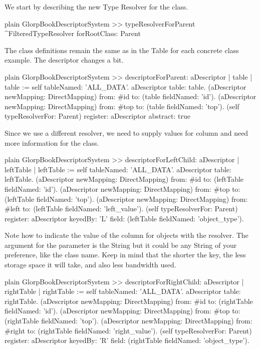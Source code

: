 \documentclass[10pt,twoside,english]{_support/latex/sbabook/sbabook}
\begin{document}
We start by describing the new Type Resolver for the  class.

\begin{displaycode}{plain}
GlorpBookDescriptorSystem >> typeResolverForParent
	^FilteredTypeResolver forRootClass: Parent
\end{displaycode}

The class definitions remain the same as in the Table for each concrete
class example. The descriptor changes a bit.

\begin{displaycode}{plain}
GlorpBookDescriptorSystem >> descriptorForParent: aDescriptor
	| table |
	table := self tableNamed: 'ALL_DATA'.
	aDescriptor table: table.
	(aDescriptor newMapping: DirectMapping)
		from: #id to: (table fieldNamed: 'id').
	(aDescriptor newMapping: DirectMapping)
		from: #top to: (table fieldNamed: 'top').
	(self typeResolverFor: Parent)
		register: aDescriptor abstract: true
\end{displaycode}

Since we use a different resolver, we need to supply values for 
column and need more information for the  class.

\begin{displaycode}{plain}
GlorpBookDescriptorSystem >> descriptorForLeftChild: aDescriptor
	| leftTable |
	leftTable := self tableNamed: 'ALL_DATA'.
	aDescriptor table: leftTable.
	(aDescriptor newMapping: DirectMapping)
		from: #id to: (leftTable fieldNamed: 'id').
	(aDescriptor newMapping: DirectMapping)
		from: #top to: (leftTable fieldNamed: 'top').
	(aDescriptor newMapping: DirectMapping)
		from: #left to: (leftTable fieldNamed: 'left_value').
	(self typeResolverFor: Parent)
		register: aDescriptor
		keyedBy: 'L'
		field: (leftTable fieldNamed: 'object_type').
\end{displaycode}

Note how to indicate the value of the  column for
 objects with the resolver.
The argument for the  parameter is the String  but it could be any String of your preference, like the class name. Keep in mind that the shorter the key, the less storage space it will take, and also less bandwidth used.

\begin{displaycode}{plain}
GlorpBookDescriptorSystem >> descriptorForRightChild: aDescriptor
	| rightTable |
	rightTable := self tableNamed: 'ALL_DATA'.
	aDescriptor table: rightTable.
	(aDescriptor newMapping: DirectMapping)
		from: #id to: (rightTable fieldNamed: 'id').
	(aDescriptor newMapping: DirectMapping)
		from: #top to: (rightTable fieldNamed: 'top').
	(aDescriptor newMapping: DirectMapping)
		from: #right to: (rightTable fieldNamed: 'right_value').
	(self typeResolverFor: Parent)
		register: aDescriptor
		keyedBy: 'R'
		field: (rightTable fieldNamed: 'object_type').
\end{displaycode}
\end{document}
